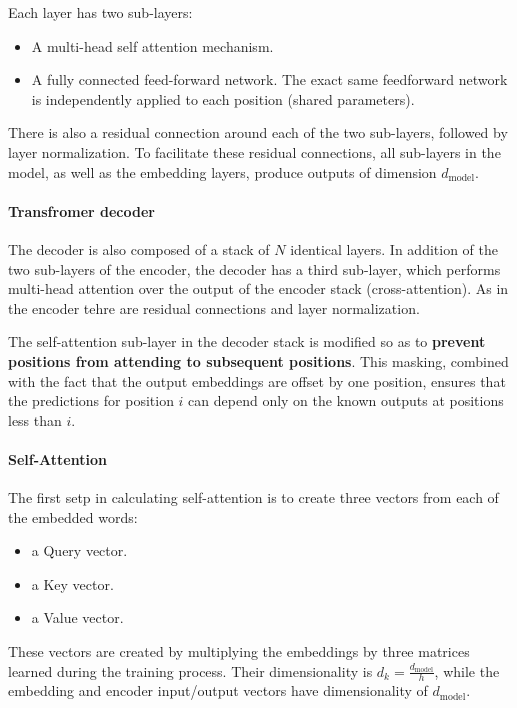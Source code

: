 \documentclass{article}
\begin{document}
Each layer has two sub-layers:
\begin{itemize}
  \item A multi-head self attention mechanism.
  \item A fully connected feed-forward network. The exact same feedforward network is independently applied to each position (shared parameters).
\end{itemize}

There is also a residual connection around each of the two sub-layers, followed by layer normalization.
To facilitate these residual connections, all sub-layers in the model, as well as the embedding layers, produce outputs of dimension $d_{\text{model}}$.

\paragraph{Transfromer decoder}
The decoder is also composed of a stack of $N$ identical layers.
In addition of the two sub-layers of the encoder, the decoder has a third sub-layer, which performs multi-head attention over the output of the encoder stack (cross-attention).
As in the encoder tehre are residual connections and layer normalization.

The self-attention sub-layer in the decoder stack is modified so as to \textbf{prevent positions from attending to subsequent positions}.
This masking, combined with the fact that the output embeddings are offset by one position, ensures that the predictions for position $i$ can depend only on the known outputs at positions less than $i$.

\paragraph{Self-Attention}
The first setp in calculating self-attention is to create three vectors from each of the embedded words:
\begin{itemize}
  \item a Query vector.
  \item a Key vector.
  \item a Value vector.
\end{itemize}

These vectors are created by multiplying the embeddings by three matrices learned during the training process.
Their dimensionality is $d_k = \frac{d_{\text{model}}}{h}$, while the embedding and encoder input/output vectors have dimensionality of $d_{\text{model}}$.
\end{document}
